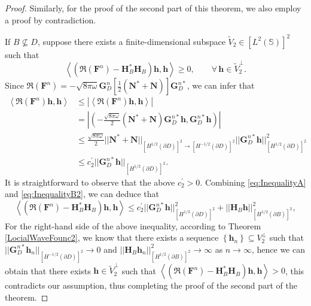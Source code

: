 \documentclass[11pt,reqno,twoside]{amsart}
\theoremstyle{definition}
\theoremstyle{remark}
\numberwithin{equation}{section}
\begin{document}
\begin{proof}
        Similarly, for the proof of the second part of this theorem, we also employ a proof by contradiction.
		
		If $B\nsubseteq D$, suppose there exists a finite-dimensional subspace $\tilde{V}_2\in \left[L^{2}\left(\mathbb S \right) \right]^2$ such that
		$$
		\left\langle \left( \Re\left( \mathbf F^n\right)-\mathbf H^*_B\mathbf H_B\right) \mathbf h, \mathbf h\right\rangle \geq 0, \qquad \forall \,\mathbf h \in \tilde{V}_2^\perp.
		$$
		Since $\Re\left( \mathbf F^n\right) = -\sqrt{8\pi\omega}\mathbf G_D^n \left[ \frac{1}{2}\left( \mathbf N^* + \mathbf N\right) \right] \mathbf G_D^{n*}$, we can infer that
		\begin{equation}\begin{aligned}\label{eq:InequalityB2}
				\left\langle \Re\left( \mathbf F^n\right) \mathbf h, \mathbf h\right\rangle
				&\leq |\left\langle \Re\left( \mathbf F^n\right) \mathbf h, \mathbf h\right\rangle| \\
				&= \left| \left( -\frac{\sqrt{8\pi\omega}}{2} \left( \mathbf N^*+\mathbf N\right) \mathbf G_D^{n*} \mathbf h, \mathbf G_D^{n*} \mathbf h \right) \right| \\
				&\leq \frac{\sqrt{8\pi\omega}}{2} ||\mathbf N^*+\mathbf N ||_{\left[H^{1/2}\left(\partial D\right) \right] ^2 \to \left[H^{-1/2}\left(\partial D\right) \right] ^2} ||\mathbf G_D^{n*} \mathbf h||^2_{\left[H^{1/2}\left(\partial D \right) \right]^2}\\
				&\leq c_2^{'}||\mathbf G_D^{n*} \mathbf h||_{\left[H^{1/2}\left(\partial D \right) \right]^2}.
		\end{aligned}\end{equation}
		It is straightforward to observe that the above $c_2^{'} > 0 $. Combining \eqref{eq:InequalityA} and \eqref{eq:InequalityB2}, we can deduce that
		$$
		\left\langle \left( \Re\left( \mathbf F^n\right)-\mathbf H^*_B\mathbf H_B\right) \mathbf h, \mathbf h\right\rangle \leq c_2^{'}||\mathbf G_D^{n*} \mathbf h||^2_{\left[H^{1/2}\left(\partial D \right) \right]^2} + ||\mathbf H_B \mathbf h||^2_{\left[H^{1/2}\left(\partial B \right) \right]^2},
		$$
		For the right-hand side of the above inequality, according to Theorem \ref{LocialWaveFounc2}, we know that there exists a sequence $\left\lbrace \mathbf h_n \right\rbrace \subseteq V_2^\perp$ such that $||\mathbf G_D^{n*} \mathbf h_n||_{\left[H^{-1/2}\left(\partial D \right) \right]^2} \to 0$ and $||\mathbf H_B \mathbf h_n||^2_{\left[H^{1/2}\left(\partial B \right) \right]^2} \to \infty$ as $n\to \infty$, hence we can obtain that there exists $\mathbf h \in \tilde{V}_2^\perp $ such that $ \left\langle \left( \Re\left( \mathbf F^n\right)-\mathbf H^*_B\mathbf H_B\right) \mathbf h, \mathbf h\right\rangle > 0$, this contradicts our assumption, thus completing the proof of the second part of the theorem.
\end{proof}
\end{document}
